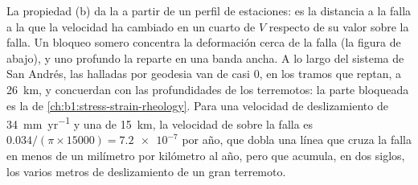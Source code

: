 La propiedad (b) da la  a partir de un perfil de estaciones: es la distancia a la falla a la que la velocidad ha
cambiado en un cuarto de $V$ respecto de su valor sobre la falla. Un bloqueo somero concentra la deformación cerca de la falla (la figura
de abajo), y uno profundo la reparte en una banda ancha. A lo largo del sistema de San Andrés, las  halladas por
geodesia van de casi 0, en los tramos que reptan, a \qty{26}{km}, y concuerdan con las profundidades de los terremotos: la parte bloqueada es
la  de \cref{ch:b1:stress-strain-rheology}. Para una velocidad de deslizamiento de \qty{34}{mm.yr^{-1}} y una  de \qty{15}{km}, la velocidad de  sobre la falla es $\num{0.034}/(\pi\times\num{15000}) = \num{7.2e-7}$ por año,
que dobla una línea que cruza la falla en menos de un milímetro por kilómetro al año, pero que acumula, en dos siglos, los varios metros de
deslizamiento de un gran terremoto.

